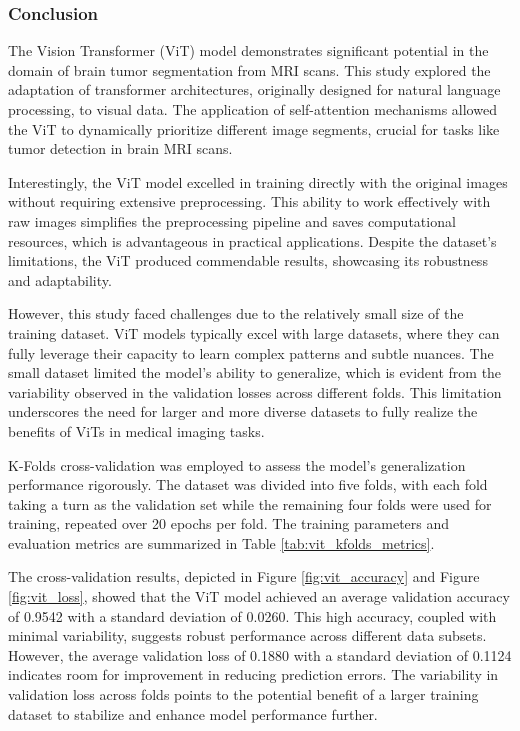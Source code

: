 \subsubsection{Conclusion}

The Vision Transformer (ViT) model demonstrates significant potential in the domain of brain tumor segmentation from MRI scans. This study explored the adaptation of transformer architectures, originally designed for natural language processing, to visual data. The application of self-attention mechanisms allowed the ViT to dynamically prioritize different image segments, crucial for tasks like tumor detection in brain MRI scans.

Interestingly, the ViT model excelled in training directly with the original images without requiring extensive preprocessing. This ability to work effectively with raw images simplifies the preprocessing pipeline and saves computational resources, which is advantageous in practical applications. Despite the dataset's limitations, the ViT produced commendable results, showcasing its robustness and adaptability.

However, this study faced challenges due to the relatively small size of the training dataset. ViT models typically excel with large datasets, where they can fully leverage their capacity to learn complex patterns and subtle nuances. The small dataset limited the model's ability to generalize, which is evident from the variability observed in the validation losses across different folds. This limitation underscores the need for larger and more diverse datasets to fully realize the benefits of ViTs in medical imaging tasks.

K-Folds cross-validation was employed to assess the model's generalization performance rigorously. The dataset was divided into five folds, with each fold taking a turn as the validation set while the remaining four folds were used for training, repeated over 20 epochs per fold. The training parameters and evaluation metrics are summarized in Table \ref{tab:vit_kfolds_metrics}.

The cross-validation results, depicted in Figure \ref{fig:vit_accuracy} and Figure \ref{fig:vit_loss}, showed that the ViT model achieved an average validation accuracy of 0.9542 with a standard deviation of 0.0260. This high accuracy, coupled with minimal variability, suggests robust performance across different data subsets. However, the average validation loss of 0.1880 with a standard deviation of 0.1124 indicates room for improvement in reducing prediction errors. The variability in validation loss across folds points to the potential benefit of a larger training dataset to stabilize and enhance model performance further.

